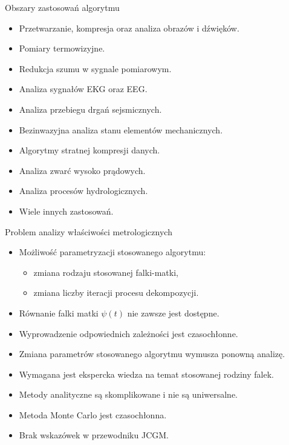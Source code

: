 \documentclass[12pt, polish, aspectratio = 169]{slides}
\begin{document}
\begin{frame}{Obszary zastosowań algorytmu}
\begin{itemize}
\item Przetwarzanie, kompresja oraz analiza obrazów i dźwięków.
\item Pomiary termowizyjne.
\item Redukcja szumu w sygnale pomiarowym.
\item Analiza sygnałów EKG oraz EEG.
\item Analiza przebiegu drgań sejsmicznych.
\item Bezinwazyjna analiza stanu elementów mechanicznych.
\item Algorytmy stratnej kompresji danych.
\item Analiza zwarć wysoko prądowych.
\item Analiza procesów hydrologicznych.
\item Wiele innych zastosowań.
\end{itemize}
\end{frame}

\begin{frame}{Problem analizy właściwości metrologicznych}
\begin{itemize}
\item Możliwość parametryzacji stosowanego algorytmu:
	\begin{itemize}
	\item zmiana rodzaju stosowanej falki-matki,
	\item zmiana liczby iteracji procesu dekompozycji.
	\end{itemize}
\item Równanie falki matki $\psi(t)$ nie zawsze jest dostępne.
\item Wyprowadzenie odpowiednich zależności jest czasochłonne.
\item Zmiana parametrów stosowanego algorytmu wymusza ponowną analizę.
\item Wymagana jest ekspercka wiedza na temat stosowanej rodziny falek.
\item Metody analityczne są skomplikowane i nie są uniwersalne.
\item Metoda Monte Carlo jest czasochłonna.
\item Brak wskazówek w przewodniku JCGM.
\end{itemize}
\end{frame}
\end{document}
